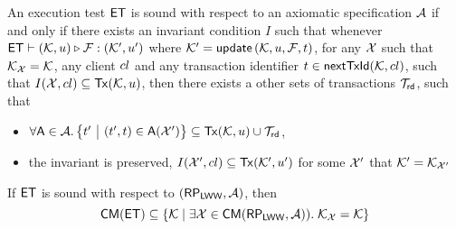 \begin{definition}
\label{def:main-body-et_sound}
An execution test $\mathsf{ET}$ is sound with respect to an axiomatic 
specification $\mathcal{A}$ if and only if there exists an 
invariant condition $I$ such that whenever $\mathsf{ET} \vdash (\mathcal{K}, u) 
\triangleright \mathcal{F}: (\mathcal{K}',u')$ where \( \mathcal{K}' = \mathsf{\mathsf{update}}\left(\mathcal{K}, u ,\mathcal{F}, t\right)\), 
for any $\mathcal{X}$ such that 
$\mathcal{K}_{\mathcal{X}} = \mathcal{K}$, any client ${cl}$ and any 
transaction identifier $t \in \mathsf{nextTxId}(\mathcal{K}, {cl})$, 
such that $I(\mathcal{X}, {cl}) \subseteq \mathsf{Tx}(\mathcal{K}, u)$, then  
there exists a other sets of transactions $\mathcal{T}_{\mathsf{rd}}$, 
such that 
\begin{itemize}
\item $\forall \A \in \Ax. \Setcon{\txid' }{ (\txid', \txid) \in \A(\aexec')} \subseteq \Tx(\hh, \vi) \cup \T_{\rd}$, 
\item the invariant is preserved, \ie $I(\mathcal{X}', {cl}) \subseteq \mathsf{Tx}(\mathcal{K}', u')$ for some \( \mathcal{X}' \) that \( \mathcal{K}' = \mathcal{K}_{\mathcal{X}'}\)
\end{itemize}
\end{definition}

\begin{theorem}
\label{thm:main-body-et_soundness}
If $\mathsf{ET}$ is sound with respect to $(\mathsf{RP}_{\mathsf{LWW}}, \mathcal{A})$, then 
\[
    \mathsf{CM}(\mathsf{ET}) \subseteq \{ \mathcal{K} \mid \exists \mathcal{X} \in \mathsf{CM}(\mathsf{RP}_{\mathsf{LWW}}, \mathcal{A})).\;\mathcal{K}_{\mathcal{X}} = \mathcal{K}\}
\]
\end{theorem}

